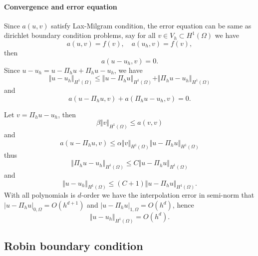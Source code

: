\documentclass[11pt,letterpaper]{article}
\begin{document}
 \paragraph{Convergence and error equation}
 Since $a(u,v)$ satisfy Lax-Milgram condition,
 the error equation can be same as dirichlet boundary condition problems,
 say
 for all $v\in V_h\subset H^1(\Omega)$ we have
\begin{displaymath}
  a( u,v)= f(v),\quad a( u_h,v)=  f(v),
\end{displaymath}
then
 \begin{displaymath}
    a(u- u_h,v)=0.
 \end{displaymath}
Since $  u-  u_h=   u-\Pi_h   u +\Pi_h   u-  u_h$, we have
\begin{displaymath}
  \Vert   u-  u_h\Vert_{H^1(\Omega)}
  \leq \Vert   u-\Pi_h   u\Vert_{H^1(\Omega)}  +\Vert\Pi_h   u-  u_h\Vert_{H^1(\Omega)}
\end{displaymath}
and
\begin{displaymath}
  a(  u-\Pi_h   u,v)+a(\Pi_h   u-  u_h,v)=0.
\end{displaymath}

Let $v=\Pi_h   u -  u_h$, then 
$$\beta \Vert v\Vert_{H^1(\Omega)}\leq a(v,v)$$
and 
\begin{displaymath}
  a(  u-\Pi_h   u,v)\leq
  \alpha \Vert v\Vert _{H^1(\Omega)}
  \Vert   u-\Pi_h   u\Vert _{H^1(\Omega)}
\end{displaymath}
thus
\begin{displaymath}
  \Vert \Pi_h   u -  u_h\Vert _{H^1(\Omega)}
  \leq C\Vert   u-\Pi_h   u\Vert _{H^1(\Omega)}
\end{displaymath}
and
\begin{displaymath}
   \Vert   u-  u_h\Vert_{H^1(\Omega)}\leq (C+1)\Vert   u-\Pi_h   u\Vert _{H^1(\Omega)}.
 \end{displaymath}
 With all polynomials is $d$-order we have the interpolation error in semi-norm that
 $\vert   u-\Pi_h   u\vert _{0,\Omega}=O(h^{d+1})$
 and $\vert   u-\Pi_h   u\vert _{1,\Omega}=O(h^d)$,
 hence
 \begin{displaymath}
   \Vert   u-  u_h\Vert_{H^1(\Omega)}=O(h^d).
 \end{displaymath}
\subsection{Robin boundary condition}
\label{sec:robin}
\end{document}

